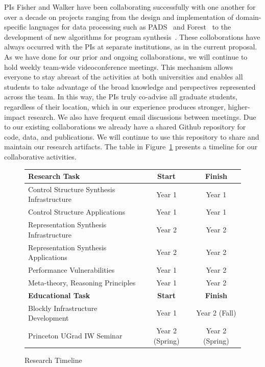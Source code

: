 PIs Fisher and Walker have been collaborating successfully
with one another for over a decade on projects ranging from the design
and implementation of domain-specific languages for data processing
such as
PADS~\cite{fisher+:next-700,fisher+:pads-overview,mandelbaum:pads-ml}
and Forest~\cite{fisher+:forest} to the development of new algorithms
for program
synthesis~\cite{fisher+:learnpads,miltner+:synthesizing-bijective-lenses,zhu+:learnpads2}.
These colloborations have always occurred with the PIs at separate
institutions, as in the current proposal.  As we have done for our
prior and ongoing collaborations, we will continue to hold weekly
team-wide videoconference meetings.  This mechanism allows everyone to
stay abreast of the activities at both universities and enables all
students to take advantage of the broad knowledge and perspectives
represented across the team.  In this way, the PIs truly co-advise all
graduate students, regardless of their location, which in our
experience produces stronger, higher-impact research.  We also have
frequent email discussions between meetings.  Due to our existing
collaborations we already have a shared Github repository for code,
data, and publications.  We will continue to use this repository to
share and maintain our research artifacts.  The table in
Figure~\ref{fig:timeline} presents a timeline for our collaborative
activities.

\begin{figure}[!hbt]
\centering
\begin{small}
\begin{tabular}{|l|c|c|}
\hline\hline
{\bf Research Task} & {\bf Start} & {\bf Finish} \\
\hline\hline
Control Structure Synthesis Infrastructure & Year 1 & Year 1\\\hline
Control Structure Applications  & Year 1& Year 1 \\\hline
Representation Synthesis Infrastructure & Year 2 & Year 2\\\hline
Representation Synthesis Applications  & Year 2 & Year 2\\\hline\hline
Performance Vulnerabilities  & Year 1 & Year 2\\\hline\hline
Meta-theory, Reasoning Principles  & Year 1 & Year 2\\\hline\hline
{\bf Educational Task} & {\bf Start} & {\bf Finish} \\\hline\hline
Blockly Infrastructure Development & Year 1 & Year 2 (Fall) \\\hline
Princeton UGrad IW Seminar & Year 2 (Spring) & Year 2 (Spring) \\\hline\hline
\end{tabular}
\end{small}
\caption{Research Timeline}\label{fig:timeline}
\end{figure} 

